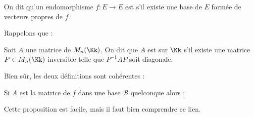 \documentclass[12pt, class=report,crop=false]{standalone}
\begin{document}
\begin{definition}
On dit qu'un endomorphisme $f : E \to E$ est  
s'il existe une base de $E$ formée de vecteurs propres de $f$.
\end{definition} 


Rappelons que :
\begin{definition}
Soit $A$ une matrice de $M_n(\Kk)$. On dit que $A$ est  
sur $\Kk$ s'il existe une matrice $P\in M_n(\Kk)$ inversible telle que $P^{-1}AP$ soit diagonale.
\end{definition} 

Bien sûr, les deux définitions sont cohérentes :
\begin{proposition}
Si $A$ est la matrice de $f$ dans une base $\mathcal{B}$ quelconque alors :
\end{proposition}

Cette proposition est facile, mais il faut bien comprendre ce lien.
\end{document}
